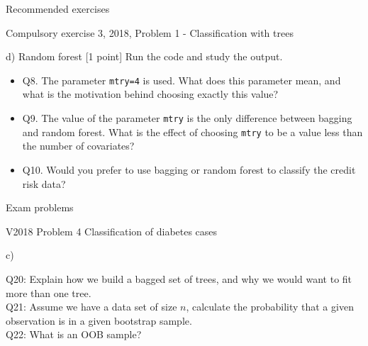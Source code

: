 \documentclass[10pt,ignorenonframetext,]{beamer}
\providecommand{\tightlist}{%
  \setlength{\itemsep}{0pt}\setlength{\parskip}{0pt}}
\begin{document}
\begin{frame}[fragile]{Recommended exercises}
\begin{block}{Compulsory exercise 3, 2018, Problem 1 - Classification
with trees}
\begin{block}{d) Random forest {[}1 point{]}}
Run the code and study the output.

\begin{itemize}
\tightlist
\item
  Q8. The parameter \texttt{mtry=4} is used. What does this parameter
  mean, and what is the motivation behind choosing exactly this value?
\item
  Q9. The value of the parameter \texttt{mtry} is the only difference
  between bagging and random forest. What is the effect of choosing
  \texttt{mtry} to be a value less than the number of covariates?
\item
  Q10. Would you prefer to use bagging or random forest to classify the
  credit risk data?
\end{itemize}

\end{block}

\end{block}

\end{frame}

\begin{frame}{Exam problems}

\begin{block}{V2018 Problem 4 Classification of diabetes cases}

\begin{block}{c)}

Q20: Explain how we build a bagged set of trees, and why we would want
to fit more than one tree.\\
Q21: Assume we have a data set of size \(n\), calculate the probability
that a given observation is in a given bootstrap sample.\\
Q22: What is an OOB sample?

\end{block}

\end{block}

\end{frame}
\end{document}

